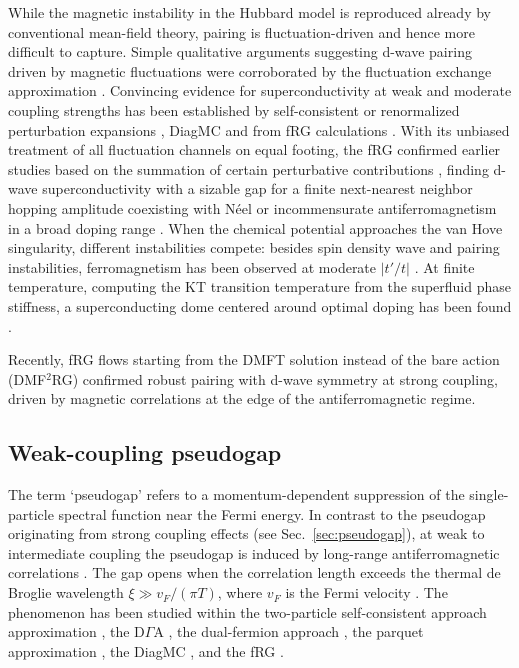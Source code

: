 \documentclass{ar-1col}
\newcommand{\sabine}[1]{{\color{brown!80}\textit{[SA: #1]}}}
\begin{document}
While the magnetic instability in the Hubbard model is reproduced already by conventional mean-field theory, pairing is fluctuation-driven and hence more difficult to capture. Simple qualitative arguments suggesting d-wave pairing driven by magnetic fluctuations were corroborated by the fluctuation exchange approximation \cite{Scalapino95}. Convincing evidence for superconductivity at weak and moderate coupling strengths has been established by self-consistent or renormalized perturbation expansions \cite{Bickers89,Neumayr03,Kyung03,Raghu10}, DiagMC \cite{Deng15,Simkovic19} and from fRG calculations \cite{Zanchi00,Halboth00B,Honerkamp01A,Honerkamp01B,Metzner12,Eberlein14}. With its unbiased treatment of all fluctuation channels on equal footing, the fRG confirmed earlier studies based on the summation of certain perturbative contributions \cite{Scalapino12},
finding d-wave superconductivity with a sizable gap for a finite next-nearest neighbor hopping amplitude \cite{Eberlein14} coexisting with N\'eel or incommensurate antiferromagnetism in a broad doping range \cite{Reiss07,Wang14,Yamase16}.
When the chemical potential approaches the van Hove singularity, different instabilities compete: besides spin density wave and pairing instabilities, ferromagnetism has been observed at moderate $|t'/t|$ \cite{Irkhin01,Hlubina97,Honerkamp01B,Katanin03,Neumayr03,Raghu10}.
At finite temperature, computing the KT transition temperature from the superfluid phase stiffness, a superconducting dome centered around optimal doping has been found \cite{Vilardi20}.\begin{marginnote}
\end{marginnote}Recently, fRG flows starting from the DMFT solution instead of the bare action (DMF$^2$RG) \cite{Taranto14,Vilardi19}
confirmed robust pairing with d-wave symmetry at strong coupling, driven by magnetic correlations at the edge of the antiferromagnetic regime. %


\subsection{Weak-coupling pseudogap}
\label{sec:weak_pseudogap}
The term `pseudogap' refers to a momentum-dependent suppression of the single-particle spectral function near the Fermi energy. In contrast to the pseudogap originating from strong coupling effects (see Sec.~\ref{sec:pseudogap}), at weak to intermediate coupling the pseudogap is induced by long-range antiferromagnetic correlations \cite{Vilk97,Borejsza04,Kyung04,Wu18,Schaefer21A}. The gap opens when the correlation length exceeds the thermal de Broglie wavelength $\xi \gg v_{F} / (\pi T)$, where $v_{F}$ is the Fermi velocity \cite{Vilk97}. 
The phenomenon has been studied within the two-particle self-consistent approach approximation \cite{Vilk97}, the D$\Gamma$A \cite{Schafer15}, the dual-fermion approach \cite{vanLoon18}, the parquet approximation \cite{Eckhardt20}, the DiagMC \cite{Simkovic20}, and the fRG \cite{Hille20B}.
\end{document}
